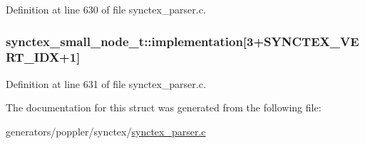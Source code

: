 Definition at line 630 of file synctex\+\_\+parser.\+c.

\hypertarget{structsynctex__small__node__t_a44b54a9cc92db940a8e32a44c76c439b}{
\subsubsection[{implementation}]{ synctex\+\_\+small\+\_\+node\+\_\+t\+::implementation\mbox{[}3+{\bf S\+Y\+N\+C\+T\+E\+X\+\_\+\+V\+E\+R\+T\+\_\+\+I\+D\+X}+1\mbox{]}}}\label{structsynctex__small__node__t_a44b54a9cc92db940a8e32a44c76c439b}


Definition at line 631 of file synctex\+\_\+parser.\+c.



The documentation for this struct was generated from the following file\+:\begin{DoxyCompactItemize}
\item 
generators/poppler/synctex/\hyperlink{synctex__parser_8c}{synctex\+\_\+parser.\+c}\end{DoxyCompactItemize}
